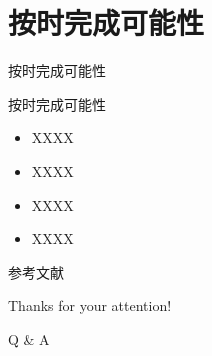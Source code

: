 \documentclass[9pt]{ctexbeamer}
\begin{document}
\section{按时完成可能性}

\begin{frame}{按时完成可能性}
  \begin{block}{按时完成可能性}
    \begin{itemize}
      \setlength{\itemsep}{6pt}
      \item XXXX 
      \item XXXX 
      \item XXXX 
      \item XXXX 
    \end{itemize}
  \end{block}
\end{frame}



\appendix

\begin{frame}[allowframebreaks]{参考文献}
  
   
\end{frame}

\begin{frame}
	\begin{center}
    {\Huge\calligra Thanks for your attention!}
    \vspace{1cm}

    {\Huge Q \& A}
  \end{center}
\end{frame}
\end{document}
